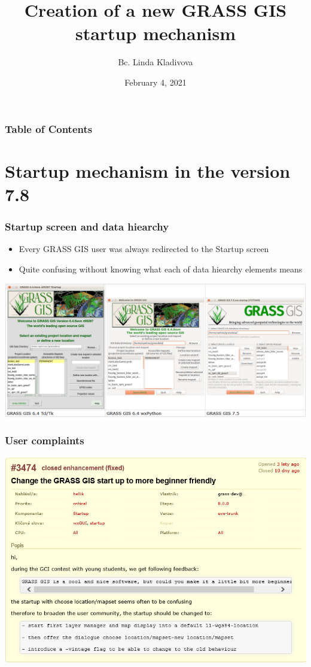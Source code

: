 \documentclass[aspectratio=169]{beamer}
\title[Creation of a new GRASS GIS startup mechanism] %
{Creation of a new GRASS GIS startup mechanism}
\author[Bc. Linda Kladivova] %
{Bc. Linda Kladivova}
\institute[Department of Geomatics] %
{
  CTU in Prague\\
  Faculty of Civil Engineering\\
  Department of Geomatics\\
  [8ex]
{\small Supervisor: Ing. Martin Landa, Ph.D.}
}
\date[February 4, 2021] %
{February 4, 2021}
\begin{document}
\frame{\titlepage}

\begin{frame}
\frametitle{Table of Contents}
\tableofcontents
\end{frame}

\section{Startup mechanism in the version 7.8}
\begin{frame}
\frametitle{Startup screen and data hiearchy}
\begin{itemize}
\item	Every GRASS GIS user was always redirected to the Startup screen
\item	Quite confusing without knowing what each of data hiearchy elements means
\end{itemize}
		\centering
	        \includegraphics[width=0.8\columnwidth]{pictures/verze_startup.png}
\end{frame}

\begin{frame}
\frametitle{User complaints}
	        	\centering
	        \includegraphics[width=0.8\columnwidth]{pictures/ticket.PNG}
\end{frame}

\end{document}

